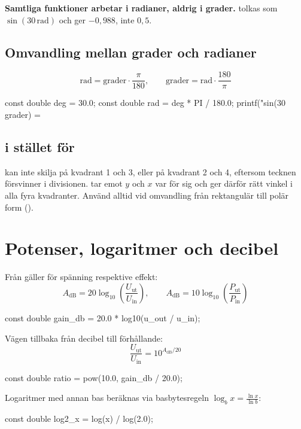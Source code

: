\textbf{Samtliga funktioner arbetar i radianer, aldrig i grader.}  tolkas som
$\sin(30\,\text{rad})$ och ger $-0{,}988$, inte $0{,}5$.

\subsection{Omvandling mellan grader och radianer}
\label{c18:sec:radianer}
\[
  \text{rad} = \text{grader} \cdot \frac{\pi}{180}, \qquad
  \text{grader} = \text{rad} \cdot \frac{180}{\pi}
\]
\begin{ccode}
const double deg = 30.0;
const double rad = deg * PI / 180.0;
printf("sin(30 grader) = %
\end{ccode}

\subsection{ i stället för }
\label{c18:sec:atan2}
 kan inte skilja på kvadrant 1 och 3, eller på kvadrant 2 och 4, eftersom
tecknen försvinner i divisionen.  tar emot $y$ och $x$ var för sig och ger
därför rätt vinkel i alla fyra kvadranter. Använd alltid  vid omvandling från
rektangulär till polär form ().

\section{Potenser, logaritmer och decibel}
\label{c18:sec:decibel}
Från  gäller för spänning respektive effekt:
\[
  A_{\text{dB}} = 20\log_{10}\left(\frac{U_{\text{ut}}}{U_{\text{in}}}\right), \qquad
  A_{\text{dB}} = 10\log_{10}\left(\frac{P_{\text{ut}}}{P_{\text{in}}}\right)
\]
\begin{ccode}
const double gain_db = 20.0 * log10(u_out / u_in);
\end{ccode}
Vägen tillbaka från decibel till förhållande:
\[
  \frac{U_{\text{ut}}}{U_{\text{in}}} = 10^{A_{\text{dB}}/20}
\]
\begin{ccode}
const double ratio = pow(10.0, gain_db / 20.0);
\end{ccode}
Logaritmer med annan bas beräknas via basbytesregeln $\log_b x = \frac{\ln x}{\ln b}$:
\begin{ccode}
const double log2_x = log(x) / log(2.0);
\end{ccode}

